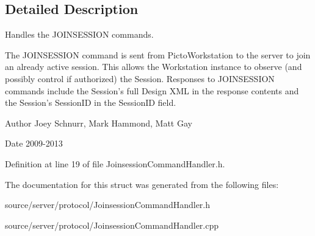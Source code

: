 \subsection{Detailed Description}
Handles the J\-O\-I\-N\-S\-E\-S\-S\-I\-O\-N commands. 

The J\-O\-I\-N\-S\-E\-S\-S\-I\-O\-N command is sent from Picto\-Workstation to the server to join an already active session. This allows the Workstation instance to observe (and possibly control if authorized) the Session. Responses to J\-O\-I\-N\-S\-E\-S\-S\-I\-O\-N commands include the Session's full Design X\-M\-L in the response contents and the Session's Session\-I\-D in the Session\-I\-D field. \begin{DoxyAuthor}{Author}
Joey Schnurr, Mark Hammond, Matt Gay 
\end{DoxyAuthor}
\begin{DoxyDate}{Date}
2009-\/2013 
\end{DoxyDate}


Definition at line 19 of file Joinsession\-Command\-Handler.\-h.



The documentation for this struct was generated from the following files\-:\begin{DoxyCompactItemize}
\item 
source/server/protocol/Joinsession\-Command\-Handler.\-h\item 
source/server/protocol/Joinsession\-Command\-Handler.\-cpp\end{DoxyCompactItemize}
